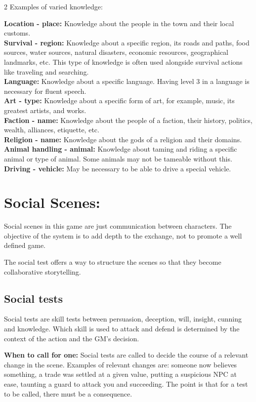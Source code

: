 \begin{multicols}{2}
Examples of varied knowledge:

\textbf{Location - place:} Knowledge about the people in the town and their local customs. \\
\textbf{Survival - region:} Knowledge about a specific region, its roads and paths, food sources, water sources, natural disasters, economic resources, geographical landmarks, etc. This type of knowledge is often used alongside survival actions like traveling and searching. \\
\textbf{Language:} Knowledge about a specific language. Having level 3 in a language is necessary for fluent speech. \\
\textbf{Art - type:} Knowledge about a specific form of art, for example, music, its greatest artists, and works. \\
\textbf{Faction - name:} Knowledge about the people of a faction, their history, politics, wealth, alliances, etiquette, etc. \\
\textbf{Religion - name:} Knowledge about the gods of a religion and their domains. \\
\textbf{Animal handling - animal:} Knowledge about taming and riding a specific animal or type of animal. Some animals may not be tameable without this. \\
\textbf{Driving - vehicle:} May be necessary to be able to drive a special vehicle. \\

\section{Social Scenes:}

Social scenes in this game are just communication between characters. The objective of the system is to add depth to the exchange, not to promote a well defined game. 

The social test offers a way to structure the scenes so that they become collaborative storytelling.

\subsection{Social tests}
Social tests are skill tests between persuasion, deception, will, insight, cunning and knowledge. Which skill is used to attack and defend is determined by the context of the action and the GM's decision. 

\textbf{When to call for one:} Social tests are called to decide the course of a relevant change in the scene. Examples of relevant changes are: someone now believes something, a trade was settled at a given value, putting a suspicious NPC at ease, taunting a guard to attack you and succeeding. The point is that for a test to be called, there must be a consequence. 


\end{multicols}
